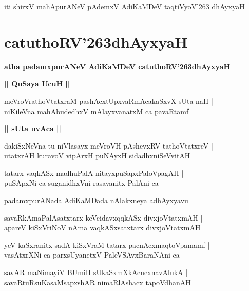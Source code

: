 \documentclass[twoside,12pt,openright]{book}
\def\S{\char'263}
\newcounter{shloka}[chapter]
\def\uvaca#1{\centerline{{\large\textbf{#1}}}}
\begin{document}
\begin{center}
iti shirxV mahApurANeV pAdemxV AdiKaMDeV taqtiVyoV\char'263 dhAyxyaH
\end{center}

\chapter{catuthoRV\S dhAyxyaH}

\begin{center}
{\LARGE\bfseries atha padamxpurANeV AdiKaMDeV catuthoRV\S dhAyxyaH}
\end{center}

\uvaca{|| QuSaya UcuH ||}

\begin{shloka}
meVroVrathoVtatxraM pashAcxtUpxvaRmAcakaSxvX sUta naH |\\
niKileVna mahAbudedhxV mAlayxvanatxM ca pavaRtamf
\end{shloka}

\uvaca{|| sUta uvAca ||}

\begin{shloka}
dakiSxNeVna tu niVlasayx meVroVH pAshevxRV tathoVtatxreV |\\
utatxrAH kuravoV vipArxH puNAyxH sidadhxniSeVvitAH
\end{shloka}

\begin{shloka}
tatarx vaqkASx madhuPalA nitayxpuSapxPaloVpagAH |\\
puSApxNi ca suganidhxVni rasavanitx PalAni ca
\end{shloka}

\begin{center}
padamxpurANada AdiKaMDada nAlakxneya adhAyxyavu
\end{center}

\begin{shloka}
savaRkAmaPalAsatxtarx keVcidavxqqkASx divxjoVtatxmAH |\\
apareV kiSxVriNoV nAma vaqkASxsatxtarx divxjoVtatxmAH
\end{shloka}

\begin{shloka}
yeV kaSxranitx sadA kiSxVraM tatarx pacnAcxmaqtoVpamamf |\\
vasAtxrXNi ca parxsUyanetxV PaleVSAvxBaraNAni ca
\end{shloka}

\begin{shloka}
savAR maNimayiV BUmiH sUkaSxmXkAcncxnavAlukA |\\
savaRtuRsuKasaMsapxshAR nimaRlAshacx tapoVdhanAH
\end{shloka}
\end{document}
